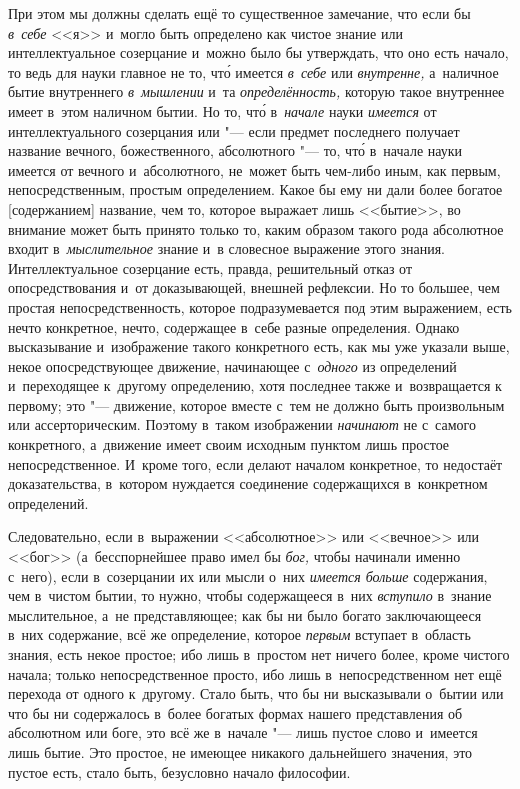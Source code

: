 При этом мы должны сделать ещё то существенное замечание, что если бы
{\em в~себе} <<я>> и~могло быть определено как чистое знание или
интеллектуальное созерцание и~можно было бы утверждать, что оно есть начало, то
ведь для науки главное не то, чт\'{о} имеется {\em в~себе} или {\em внутренне,}
а~наличное бытие внутреннего {\em в~мышлении} и~та {\em определённость,}
которую такое внутреннее имеет в~этом наличном бытии. Но то, чт\'{о}
в~{\em начале} науки {\em имеется} от интеллектуального созерцания или "---
если предмет последнего получает название вечного, божественного, абсолютного
"--- то, чт\'{о} в~начале науки имеется от вечного и~абсолютного, не~может быть
чем-либо иным, как первым, непосредственным, простым определением. Какое бы
ему ни дали более богатое [содержанием] название, чем то, которое выражает
лишь <<бытие>>, во внимание может быть принято только то, каким образом
такого рода абсолютное входит в~{\em мыслительное} знание и~в словесное
выражение этого знания. Интеллектуальное созерцание есть, правда,
решительный отказ от опосредствования и~от доказывающей, внешней рефлексии. Но то
большее, чем простая непосредственность, которое подразумевается под этим
выражением, есть нечто конкретное, нечто, содержащее в~себе разные определения.
Однако высказывание и~изображение такого конкретного есть, как мы уже указали
выше, некое опосредствующее движение, начинающее с~{\em одного} из определений
и~переходящее к~другому определению, хотя последнее также и~возвращается к
первому; это "--- движение, которое вместе с~тем не должно быть произвольным
или ассерторическим. Поэтому в~таком изображении {\em начинают} не с~самого
конкретного, а~движение имеет своим исходным пунктом лишь простое
непосредственное. И~кроме того, если делают началом конкретное, то недостаёт
доказательства, в~котором нуждается соединение содержащихся в~конкретном
определений.

Следовательно, если в~выражении <<абсолютное>> или <<вечное>> или <<бог>>
(а~бесспорнейшее право имел бы {\em бог,} чтобы начинали именно с~него), если
в~созерцании их или мысли о~них {\em имеется больше} содержания, чем в~чистом
бытии, то нужно, чтобы содержащееся в~них {\em вступило} в~знание мыслительное,
а~не представляющее; как бы ни было богато заключающееся в~них содержание, всё
же определение, которое {\em первым} вступает в~область знания, есть некое
простое; ибо лишь в~простом нет ничего более, кроме чистого начала; только
непосредственное просто, ибо лишь в~непосредственном нет ещё перехода от одного
к~другому. Стало быть, что бы ни высказывали о~бытии или что бы ни содержалось
в~более богатых формах нашего представления об абсолютном или боге, это всё же
в~начале "--- лишь пустое слово и~имеется лишь бытие. Это простое, не имеющее
никакого дальнейшего значения, это пустое есть, стало быть, безусловно начало
философии.

